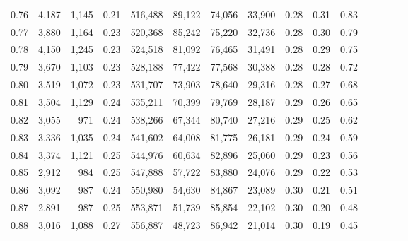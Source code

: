 \begin{tabular}{rrrcrrrrrrrrrrr}
0.76 &   4,187 &   1,145 &                                       0.21 &  516,488 &   89,122 &   74,056 &   33,900 &  0.28 &  0.31 &                         0.83 \\
0.77 &   3,880 &   1,164 &                                       0.23 &  520,368 &   85,242 &   75,220 &   32,736 &  0.28 &  0.30 &                         0.79 \\
0.78 &   4,150 &   1,245 &                                       0.23 &  524,518 &   81,092 &   76,465 &   31,491 &  0.28 &  0.29 &                         0.75 \\
0.79 &   3,670 &   1,103 &                                       0.23 &  528,188 &   77,422 &   77,568 &   30,388 &  0.28 &  0.28 &                         0.72 \\
0.80 &   3,519 &   1,072 &                                       0.23 &  531,707 &   73,903 &   78,640 &   29,316 &  0.28 &  0.27 &                         0.68 \\
0.81 &   3,504 &   1,129 &                                       0.24 &  535,211 &   70,399 &   79,769 &   28,187 &  0.29 &  0.26 &                         0.65 \\
0.82 &   3,055 &     971 &                                       0.24 &  538,266 &   67,344 &   80,740 &   27,216 &  0.29 &  0.25 &                         0.62 \\
0.83 &   3,336 &   1,035 &                                       0.24 &  541,602 &   64,008 &   81,775 &   26,181 &  0.29 &  0.24 &                         0.59 \\
0.84 &   3,374 &   1,121 &                                       0.25 &  544,976 &   60,634 &   82,896 &   25,060 &  0.29 &  0.23 &                         0.56 \\
0.85 &   2,912 &     984 &                                       0.25 &  547,888 &   57,722 &   83,880 &   24,076 &  0.29 &  0.22 &                         0.53 \\
0.86 &   3,092 &     987 &                                       0.24 &  550,980 &   54,630 &   84,867 &   23,089 &  0.30 &  0.21 &                         0.51 \\
0.87 &   2,891 &     987 &                                       0.25 &  553,871 &   51,739 &   85,854 &   22,102 &  0.30 &  0.20 &                         0.48 \\
0.88 &   3,016 &   1,088 &                                       0.27 &  556,887 &   48,723 &   86,942 &   21,014 &  0.30 &  0.19 &                         0.45 \\

\end{tabular}
